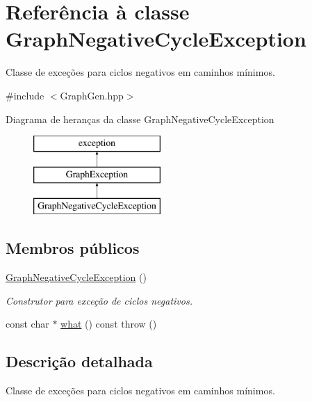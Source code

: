 \hypertarget{classGraphNegativeCycleException}{}\section{Referência à classe Graph\+Negative\+Cycle\+Exception}
\label{classGraphNegativeCycleException}


Classe de exceções para ciclos negativos em caminhos mínimos.  




{\ttfamily \#include $<$Graph\+Gen.\+hpp$>$}

Diagrama de heranças da classe Graph\+Negative\+Cycle\+Exception\begin{figure}[H]
\begin{center}
\leavevmode
\includegraphics[height=3.000000cm]{classGraphNegativeCycleException}
\end{center}
\end{figure}
\subsection*{Membros públicos}
\begin{DoxyCompactItemize}
\item 
\mbox{\label{classGraphNegativeCycleException_ae4862d8b8e61233ff35331fbe188f98d}} 
\mbox{\hyperlink{classGraphNegativeCycleException_ae4862d8b8e61233ff35331fbe188f98d}{Graph\+Negative\+Cycle\+Exception}} ()
\begin{DoxyCompactList}\small\item\em Construtor para exceção de ciclos negativos. \end{DoxyCompactList}\item 
const char $\ast$ \mbox{\hyperlink{classGraphNegativeCycleException_ae973328a57ec48ac66298365bfe7ded4}{what}} () const  throw ()
\end{DoxyCompactItemize}


\subsection{Descrição detalhada}
Classe de exceções para ciclos negativos em caminhos mínimos. 

